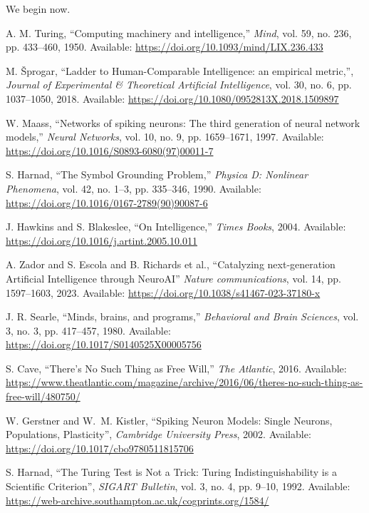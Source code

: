 \documentclass{article}
\newenvironment{ttquote}{
  \begin{minipage}[t]{0.9\linewidth}
  \ttfamily
  \setlength{\parindent}{0pt}   %
  \setlength{\parskip}{0.7em}   %
}{
  \end{minipage}
}
\begin{document}
\begin{ttquote}
We begin now.
\end{ttquote}

\newpage

\begin{thebibliography}{99}

A. M. Turing, 
``Computing machinery and intelligence,'' 
\textit{Mind}, vol. 59, no. 236, pp. 433--460, 1950. Available: \url{https://doi.org/10.1093/mind/LIX.236.433}

M. Šprogar, 
``Ladder to Human-Comparable Intelligence: an empirical metric,'', 
\textit{Journal of Experimental \& Theoretical Artificial Intelligence},
vol. 30, no. 6, pp. 1037--1050, 2018. Available: \url{https://doi.org/10.1080/0952813X.2018.1509897}

W. Maass, 
``Networks of spiking neurons: The third generation of neural network models,'' 
\textit{Neural Networks}, vol. 10, no. 9, pp. 1659--1671, 1997. Available: \url{https://doi.org/10.1016/S0893-6080(97)00011-7}

S. Harnad, 
``The Symbol Grounding Problem,'' 
\textit{Physica D: Nonlinear Phenomena}, vol. 42, no. 1--3, pp. 335--346, 1990. Available: \url{https://doi.org/10.1016/0167-2789(90)90087-6}

J. Hawkins and S. Blakeslee,
``On Intelligence,'' 
\textit{Times Books}, 2004. Available: \url{https://doi.org/10.1016/j.artint.2005.10.011}

A. Zador and S. Escola and B. Richards et al.,
``Catalyzing next-generation Artificial Intelligence through NeuroAI''
\textit{Nature communications}, vol. 14, pp. 1597--1603, 2023. Available:
\url{https://doi.org/10.1038/s41467-023-37180-x}

J. R. Searle, 
``Minds, brains, and programs,'' 
\textit{Behavioral and Brain Sciences}, vol. 3, no. 3, pp. 417--457, 1980. Available: \url{https://doi.org/10.1017/S0140525X00005756}

S. Cave, 
``There’s No Such Thing as Free Will,''
\textit{The Atlantic},
2016. Available: \url{https://www.theatlantic.com/magazine/archive/2016/06/theres-no-such-thing-as-free-will/480750/}

W. Gerstner and W.~M. Kistler,
``Spiking Neuron Models: Single Neurons, Populations, Plasticity'',
\textit{Cambridge University Press}, 2002. Available:
\url{https://doi.org/10.1017/cbo9780511815706}

S. Harnad,
``The Turing Test is Not a Trick: Turing Indistinguishability is a Scientific Criterion'',
\textit{SIGART Bulletin}, vol. 3, no. 4, pp. 9--10, 1992. Available: \url{https://web-archive.southampton.ac.uk/cogprints.org/1584/}


\end{thebibliography}
\end{document}
